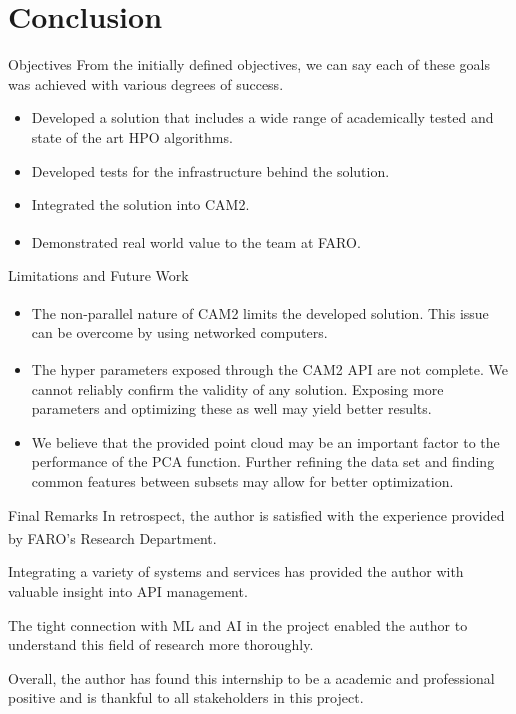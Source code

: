 \documentclass[10pt]{beamer}
\newcommand{\farons}[0]{FARO\textsuperscript{\textregistered}}
\begin{document}
  \section{Conclusion}
  \begin{frame}{Objectives}
    From the initially defined objectives, we can say each of these goals was achieved with various degrees of success. 
    \begin{itemize}
      \item Developed a solution that includes a wide range of academically tested and state of the art HPO algorithms.
      \item Developed tests for the infrastructure behind the solution.
      \item Integrated the solution into CAM2.
      \item Demonstrated real world value to the team at \farons.
    \end{itemize}
  \end{frame}
  \begin{frame}{Limitations and Future Work}
    \begin{itemize}
    \item The non-parallel nature of CAM2\textsuperscript{\textregistered} limits the developed solution. This issue can be overcome by using networked computers.
    \item The hyper parameters exposed through the CAM2\textsuperscript{\textregistered} API are not complete. We cannot reliably confirm the validity of any solution. Exposing more parameters and optimizing these as well may yield better results.
    \item We believe that the provided point cloud may be an important factor to the performance of the PCA function. Further refining the data set and finding common features between subsets may allow for better optimization.
    \end{itemize}
  \end{frame}
  \begin{frame}{Final Remarks}
    In retrospect, the author is satisfied with the experience provided by \farons 's Research Department.

    Integrating a variety of systems and services has provided the author with valuable insight into API management.

    The tight connection with ML and AI in the project enabled the author to understand this field of research more thoroughly.

    Overall, the author has found this internship to be a academic and professional positive and is thankful to all stakeholders in this project.
  \end{frame}
\end{document}
